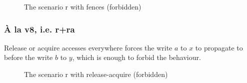 \documentclass[a4paper]{article}
\begin{document}
\begin{figure}[!h]
\begin{center}
\end{center}
\vspace*{-5mm}
\caption{The scenario \textsf{r} with fences (forbidden)\label{fig:r}}
\end{figure}


\subsubsection{\`A la v8, i.e. \textsf{r+ra}}

Release or acquire accesses everywhere forces the write $a$ to $x$ to propagate
to  before the write $b$ to $y$, which is enough to forbid the
behaviour. 

\begin{figure}[!h]
\begin{center}
\end{center}
\vspace*{-5mm}
\caption{The scenario \textsf{r} with release-acquire (forbidden)\label{fig:r-ra}}
\end{figure}


\clearpage

 
\end{document}
